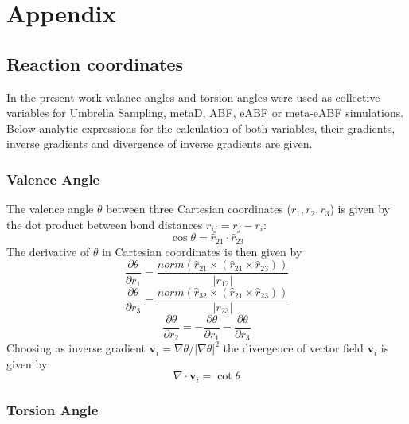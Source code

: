 \chapter{Appendix}
\label{cha:appendix}

\section{Reaction coordinates}
\label{sec:reaction coordinates}

In the present work valance angles and torsion angles were used as collective variables for Umbrella Sampling, metaD, ABF, eABF or meta-eABF simulations. Below analytic expressions for the calculation of both variables, their gradients, inverse gradients and divergence of inverse gradients are given.

\subsection{Valence Angle}
The valence angle $\theta$ between three Cartesian coordinates ($r_1, r_2, r_3$) is given by the dot product between bond distances $r_{ij}=r_j - r_i$:
\begin{equation}
  \cos \theta = \hat{r}_{21} \cdot \hat{r}_{23}
\end{equation}
The derivative of $\theta$ in Cartesian coordinates is then given by
\begin{equation}
  \frac{\partial \theta}{\partial r_1} = \frac{norm(\hat{r}_{21} \times (\hat{r}_{21} \times \hat{r}_{23}))}{|r_{12}|}
\end{equation}
\begin{equation}
  \frac{\partial \theta}{\partial r_3} = \frac{norm(\hat{r}_{32} \times (\hat{r}_{21} \times \hat{r}_{23}))}{|r_{23}|}
\end{equation}
\begin{equation}
  \frac{\partial \theta}{\partial r_2}= -\frac{\partial \theta}{\partial r_1} - \frac{\partial \theta}{\partial r_3}
\end{equation}
Choosing as inverse gradient $\textbf{v}_i = \nabla \theta/|\nabla \theta|^2$ the divergence of vector field $\textbf{v}_i$ is given by:
\begin{equation}
  \nabla \cdot \textbf{v}_i = \cot \theta
\end{equation}

\subsection{Torsion Angle}

